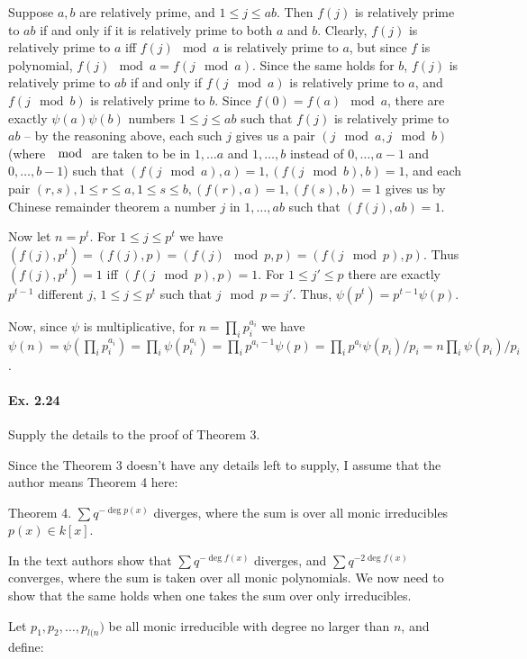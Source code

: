 \documentclass[notitlepage]{article}
\theoremstyle{definition}
\begin{document}
Suppose $a, b$ are relatively prime, and $1 \leq j \leq ab$. Then
$f(j)$ is relatively prime to $ab$ if and only if it is relatively
prime to both $a$ and $b$. Clearly, $f(j)$ is relatively prime to $a$
iff $f(j) \mod a$ is relatively prime to $a$, but since $f$ is
polynomial, $f(j) \mod a = f(j \mod a)$. Since the same holds for $b$,
$f(j)$ is relatively prime to $ab$ if and only if $f(j \mod a)$ is
relatively prime to $a$, and $f(j \mod b)$ is relatively prime to
$b$. Since $f(0) = f(a) \mod a$, there are exactly $\psi(a)\psi(b)$
numbers $1 \leq j \leq ab$ such that $f(j)$ is relatively prime to
$ab$ -- by the reasoning above, each such $j$ gives us a pair $(j \mod
a, j \mod b)$ (where $\mod$ are taken to be in $1, \ldots a$ and $1,
\ldots, b$ instead of $0, \ldots, a-1$ and $0, \ldots, b-1$) such that
$(f(j \mod a), a) = 1, (f(j \mod b), b) = 1$, and each pair $(r, s), 1
\leq r \leq a, 1 \leq s \leq b, (f(r), a) = 1, (f(s), b) = 1$ gives us
by Chinese remainder theorem a number $j$ in $1, \ldots, ab$ such that
$(f(j), ab) = 1$.

Now let $n = p^t$. For $1 \leq j \leq p^t$ we have $(f(j), p^t) =
(f(j), p) = (f(j) \mod p, p) = (f(j \mod p), p)$. Thus $(f(j), p^t) =
1$ iff $(f(j \mod p), p) = 1$. For $1 \leq j' \leq p$ there are
exactly $p^{t-1}$ different $j$, $1 \leq j \leq p^t$ such that $j \mod
p = j'$. Thus, $\psi(p^t) = p^{t-1} \psi(p)$.

Now, since $\psi$ is multiplicative, for $n = \prod_i p_i^{a_i}$ we
have $\psi(n) = \psi(\prod_i p_i^{a_i})= \prod_i \psi(p_i^{a_i}) =
\prod_i p^{a_i - 1} \psi(p) = \prod_i p^{a_i} \psi(p_i)/p_i = n
\prod_i \psi(p_i)/p_i$.

\paragraph{Ex. 2.24}
Supply the details to the proof of Theorem 3.

Since the Theorem 3 doesn't have any details left to supply, I assume
that the author means Theorem 4 here:

Theorem 4. $\sum q^{-\deg p(x)}$ diverges, where the sum is over all monic
irreducibles $p(x)\in k[x]$.

In the text authors show that $\sum q^{-\deg f(x)}$ diverges, and
$\sum q^{-2\deg f(x)}$ converges, where the sum is taken over all
monic polynomials. We now need to show that the same holds when one
takes the sum over only irreducibles.

Let $p_1, p_2, \ldots, p_{l(n})$ be all monic irreducible with degree
no larger than $n$, and define:
\end{document}
